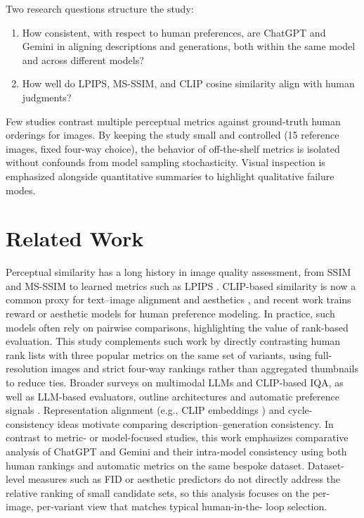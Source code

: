 \documentclass[conference]{IEEEtran}
\begin{document}
Two research questions structure the study:
\begin{enumerate}
    \item[RQ1] How consistent, with respect to human preferences, are ChatGPT and Gemini in aligning descriptions and generations, both within the same model and across different models?
    \item[RQ2] How well do LPIPS, MS-SSIM, and CLIP cosine similarity align with human judgments?
\end{enumerate}

Few studies contrast multiple perceptual metrics against ground-truth human orderings for images. By keeping the study small and controlled (15 reference images, fixed four-way choice), the behavior of off-the-shelf metrics is isolated without confounds from model sampling stochasticity. Visual inspection is emphasized alongside quantitative summaries to highlight qualitative failure modes.

\section{Related Work}
Perceptual similarity has a long history in image quality
assessment, from SSIM and MS-SSIM \cite{ssim,msssim} to learned
metrics such as LPIPS \cite{lpips}. CLIP-based similarity is now a
common proxy for text–image alignment and aesthetics \cite{clip,clipscoreshuster},
and recent work trains reward or aesthetic models for
human preference modeling. In practice, such models often rely on
pairwise comparisons, highlighting the value of rank-based evaluation.
This study complements such work by
directly contrasting human
rank lists with three popular metrics on the same set of variants,
using full-resolution images and strict four-way rankings rather
than aggregated thumbnails to reduce ties. Broader surveys on
multimodal LLMs and CLIP-based IQA, as well as LLM-based
evaluators, outline architectures and automatic preference
signals \cite{wu2023survey,yu2025survey,tang2024clipagiqa,liu2023geval}. Representation alignment (e.g., CLIP
embeddings \cite{clip}) and cycle-consistency ideas motivate
comparing description–generation consistency. In contrast to
metric- or model-focused studies, this work emphasizes comparative
analysis of ChatGPT and Gemini and their intra-model consistency
using both human rankings and automatic metrics on the same
bespoke dataset. Dataset-level measures such as FID \cite{fid} or
aesthetic predictors do not directly address the relative ranking
of small candidate sets, so this analysis focuses on the per-
image, per-variant view that matches typical human-in-the-
loop selection.
\end{document}
